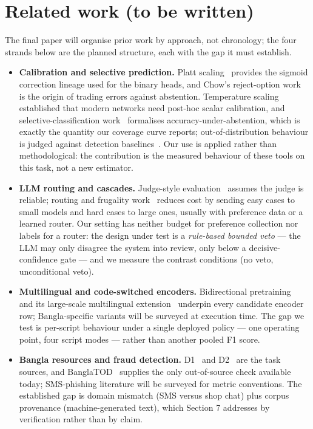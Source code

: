\documentclass[11pt]{article}
\begin{document}
\section{Related work (to be written)}
\label{sec:related}
The final paper will organise prior work by approach, not chronology; the four
strands below are the planned structure, each with the gap it must establish.
\begin{itemize}[leftmargin=*,itemsep=2pt,topsep=3pt]
      \item \textbf{Calibration and selective prediction.} Platt scaling~\cite{platt1999}
      provides the sigmoid correction lineage used for the binary heads, and
      Chow's reject-option work~\cite{chow1970} is the origin of trading errors against
      abstention. Temperature scaling~\cite{guo2017} established that modern networks need
      post-hoc scalar calibration, and selective-classification work~\cite{geifman2017} formalises
      accuracy-under-abstention, which is exactly the quantity our coverage
      curve reports; out-of-distribution behaviour is judged against detection baselines~\cite{hendrycks2017}. Our use is applied rather than methodological: the
      contribution is the measured behaviour of these tools on this task, not
      a new estimator.
      \item \textbf{LLM routing and cascades.} Judge-style evaluation~\cite{zheng2023} assumes
      the judge is reliable; routing and frugality work~\cite{chen2023,ong2024} reduces cost by
      sending easy cases to small models and hard cases to large ones, usually
      with preference data or a learned router. Our setting has neither budget
      for preference collection nor labels for a router: the design under test
      is a \emph{rule-based bounded veto} --- the LLM may only disagree the
      system into review, only below a decisive-confidence gate --- and we
      measure the contrast conditions (no veto, unconditional veto).
      \item \textbf{Multilingual and code-switched encoders.} Bidirectional
      pretraining~\cite{devlin2019} and its large-scale multilingual extension~\cite{conneau2020} underpin every
      candidate encoder row; Bangla-specific variants will be surveyed at
      execution time. The gap we test is per-script behaviour under a single
      deployed policy --- one operating point, four script modes --- rather
      than another pooled F1 score.
      \item \textbf{Bangla resources and fraud detection.} D1~\cite{d1} and D2~\cite{d2} are the
      task sources, and BanglaTOD~\cite{banglatod} supplies the only out-of-source check
      available today; SMS-phishing literature will be surveyed for metric
      conventions. The established gap is domain mismatch (SMS versus shop
      chat) plus corpus provenance (machine-generated text), which Section 7
      addresses by verification rather than by claim.
\end{itemize}
\end{document}
